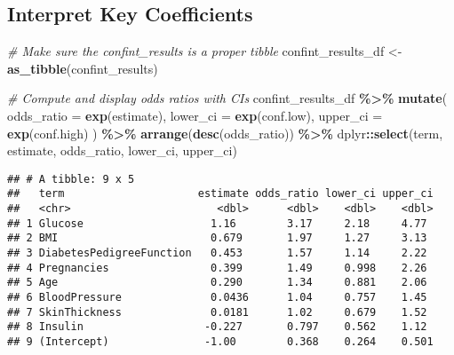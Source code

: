 \documentclass[
]{article}
\newenvironment{Shaded}{\begin{snugshade}}{\end{snugshade}}
\newcommand{\AttributeTok}[1]{\textcolor[rgb]{0.13,0.29,0.53}{#1}}
\newcommand{\CommentTok}[1]{\textcolor[rgb]{0.56,0.35,0.01}{\textit{#1}}}
\newcommand{\FunctionTok}[1]{\textcolor[rgb]{0.13,0.29,0.53}{\textbf{#1}}}
\newcommand{\NormalTok}[1]{#1}
\newcommand{\OtherTok}[1]{\textcolor[rgb]{0.56,0.35,0.01}{#1}}
\newcommand{\SpecialCharTok}[1]{\textcolor[rgb]{0.81,0.36,0.00}{\textbf{#1}}}
\begin{document}
\subsection{Interpret Key
Coefficients}\label{interpret-key-coefficients}

\begin{Shaded}
\begin{Highlighting}[]
\CommentTok{\# Make sure the confint\_results is a proper tibble}
\NormalTok{confint\_results\_df }\OtherTok{\textless{}{-}} \FunctionTok{as\_tibble}\NormalTok{(confint\_results)}

\CommentTok{\# Compute and display odds ratios with CIs}
\NormalTok{confint\_results\_df }\SpecialCharTok{\%\textgreater{}\%}
  \FunctionTok{mutate}\NormalTok{(}
    \AttributeTok{odds\_ratio =} \FunctionTok{exp}\NormalTok{(estimate),}
    \AttributeTok{lower\_ci =} \FunctionTok{exp}\NormalTok{(conf.low),}
    \AttributeTok{upper\_ci =} \FunctionTok{exp}\NormalTok{(conf.high)}
\NormalTok{  ) }\SpecialCharTok{\%\textgreater{}\%}
  \FunctionTok{arrange}\NormalTok{(}\FunctionTok{desc}\NormalTok{(odds\_ratio)) }\SpecialCharTok{\%\textgreater{}\%}
\NormalTok{  dplyr}\SpecialCharTok{::}\FunctionTok{select}\NormalTok{(term, estimate, odds\_ratio, lower\_ci, upper\_ci)}
\end{Highlighting}
\end{Shaded}

\begin{verbatim}
## # A tibble: 9 x 5
##   term                     estimate odds_ratio lower_ci upper_ci
##   <chr>                       <dbl>      <dbl>    <dbl>    <dbl>
## 1 Glucose                    1.16        3.17     2.18     4.77 
## 2 BMI                        0.679       1.97     1.27     3.13 
## 3 DiabetesPedigreeFunction   0.453       1.57     1.14     2.22 
## 4 Pregnancies                0.399       1.49     0.998    2.26 
## 5 Age                        0.290       1.34     0.881    2.06 
## 6 BloodPressure              0.0436      1.04     0.757    1.45 
## 7 SkinThickness              0.0181      1.02     0.679    1.52 
## 8 Insulin                   -0.227       0.797    0.562    1.12 
## 9 (Intercept)               -1.00        0.368    0.264    0.501
\end{verbatim}
\end{document}
